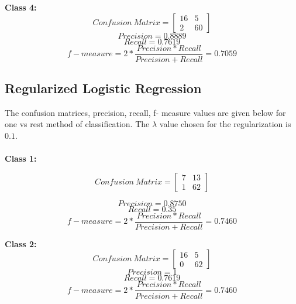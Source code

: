 \documentclass[12pt]{article}
\begin{document}
\textbf{Class 4:}
\begin{equation}
Confusion\ Matrix = \begin{bmatrix} 16  & 5 \\ 2 & 60 \end{bmatrix}
\end{equation}
\begin{equation}
Precision = 0.8889
\end{equation}
\begin{equation}
Recall = 0.7619
\end{equation}
\begin{equation}
f-measure = 2*\frac{Precision*Recall}{Precision + Recall} = 0.7059
\end{equation}


\subsection{Regularized Logistic Regression}

The confusion matrices, precision, recall, f- measure values are given below for one vs rest method of classification. The $\lambda$ value chosen for the regularization is $0.1$. 
\\
\\
\textbf{Class 1:}

\begin{equation}
Confusion\ Matrix = \begin{bmatrix} 7  & 13 \\ 1 & 62 \end{bmatrix}
\end{equation}

\begin{equation}
Precision = 0.8750
\end{equation}
\begin{equation}
Recall = 0.35
\end{equation}
\begin{equation}
f-measure = 2*\frac{Precision*Recall}{Precision + Recall} = 0.7460
\end{equation}


\textbf{Class 2:}
\begin{equation}
Confusion\ Matrix = \begin{bmatrix} 16  & 5 \\ 0 & 62 \end{bmatrix}
\end{equation}
\begin{equation}
Precision = 1
\end{equation}
\begin{equation}
Recall = 0.7619
\end{equation}
\begin{equation}
f-measure = 2*\frac{Precision*Recall}{Precision + Recall} = 0.7460
\end{equation}
\end{document}
